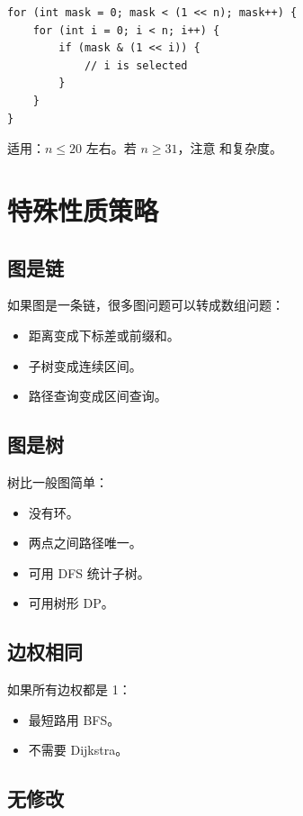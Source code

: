 \begin{lstlisting}
for (int mask = 0; mask < (1 << n); mask++) {
    for (int i = 0; i < n; i++) {
        if (mask & (1 << i)) {
            // i is selected
        }
    }
}
\end{lstlisting}

适用：$n \le 20$ 左右。若 $n \ge 31$，注意  和复杂度。

\section{特殊性质策略}\label{sec:08-6}

\subsection{图是链}

如果图是一条链，很多图问题可以转成数组问题：

\begin{itemize}
  \item 距离变成下标差或前缀和。
  \item 子树变成连续区间。
  \item 路径查询变成区间查询。
\end{itemize}

\subsection{图是树}

树比一般图简单：

\begin{itemize}
  \item 没有环。
  \item 两点之间路径唯一。
  \item 可用 DFS 统计子树。
  \item 可用树形 DP。
\end{itemize}

\subsection{边权相同}

如果所有边权都是 1：

\begin{itemize}
  \item 最短路用 BFS。
  \item 不需要 Dijkstra。
\end{itemize}

\subsection{无修改}

